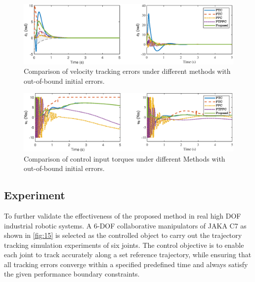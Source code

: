\documentclass[pdflatex,sn-mathphys-num]{sn-jnl}%
\theoremstyle{thmstyleone}%
\theoremstyle{thmstyletwo}%
\theoremstyle{thmstylethree}%
\begin{document}
\begin{figure}[H]
	\centering
	\includegraphics[width=0.9\linewidth]{fig13.eps}
	\caption{Comparison of velocity tracking errors under different methods with out-of-bound initial errors.}
	\label{fig:13}
\end{figure}

\begin{figure}[H]
	\centering
	\includegraphics[width=0.9\linewidth]{fig14.eps}
	\caption{Comparison of control input torques under different Methods with out-of-bound initial errors.}
	\label{fig:14}
\end{figure}



\subsection{Experiment}

To further validate the effectiveness of the proposed method in real high DOF industrial robotic systems. A 6-DOF collaborative manipulators of JAKA C7 as shown in \cref{fig:15} is selected as the controlled object to carry out the trajectory tracking simulation experiments of six joints. The control objective is to enable each joint to track accurately along a set reference trajectory, while ensuring that all tracking errors converge within a specified predefined time and always satisfy the given performance boundary constraints.
\end{document}
